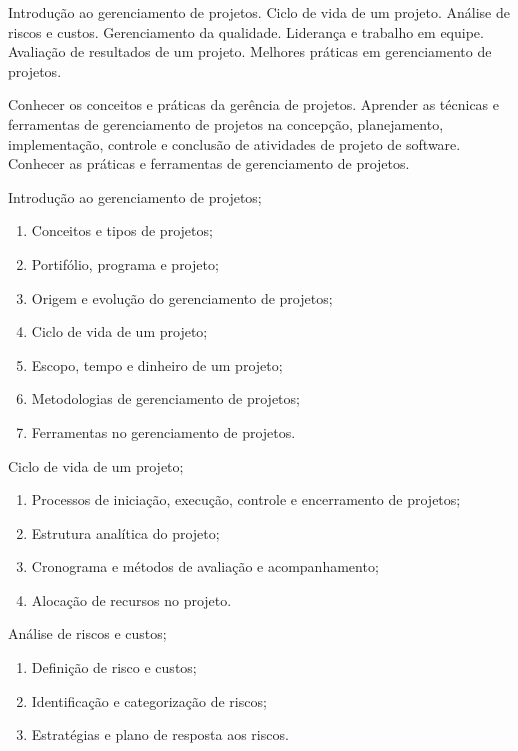 
\begin{pud}

	
	\ementa
	Introdução ao gerenciamento de projetos. Ciclo de vida de um projeto. Análise de riscos e custos. Gerenciamento da qualidade. Liderança e trabalho em equipe. Avaliação de resultados de um projeto. Melhores práticas em gerenciamento de projetos.
	
	\objetivos
	Conhecer os conceitos e práticas da gerência de projetos. Aprender as técnicas e ferramentas de gerenciamento de projetos na concepção, planejamento, implementação, controle e conclusão de atividades de projeto de software.  Conhecer as práticas e ferramentas de gerenciamento de projetos.
	
	
	\programa
	\begin{description}[itemsep=0em]
		\item[UNIDADE I:] Introdução ao gerenciamento de projetos;
		\begin{enumerate}[itemsep=0em, topsep=0em]
			\item Conceitos e tipos de projetos;
			\item Portifólio, programa e projeto;
			\item Origem e evolução do gerenciamento de projetos;
			\item Ciclo de vida de um projeto;
			\item Escopo, tempo e dinheiro de um projeto;
			\item Metodologias de gerenciamento de projetos;
			\item Ferramentas no gerenciamento de projetos.
		\end{enumerate}
		
	    \item[UNIDADE II:] Ciclo de vida de um projeto;
		\begin{enumerate}[itemsep=0em, topsep=0em]
			\item Processos de iniciação, execução, controle e encerramento de projetos;
			\item Estrutura analítica do projeto;
			\item Cronograma e métodos de avaliação e acompanhamento;
			\item Alocação de recursos no projeto.
		\end{enumerate}
		
        \item[UNIDADE III:] Análise de riscos e custos;
		\begin{enumerate}[itemsep=0em, topsep=0em]
			\item  Definição de risco e custos;
			\item  Identificação e categorização de riscos;
			\item  Estratégias e plano de resposta aos riscos.
		\end{enumerate}


\end{description}
\end{pud}
